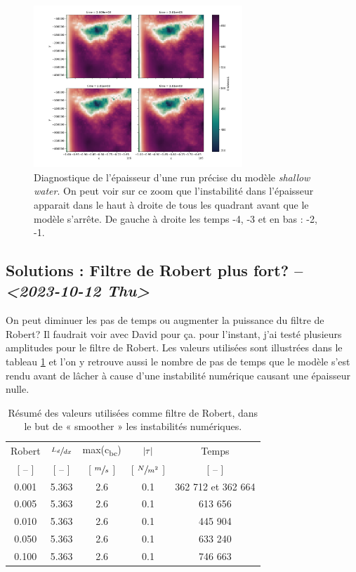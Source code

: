 \documentclass[10pt]{article}
\numberwithin{equation}{section}
\begin{document}
\begin{figure}[!htpb]
\centering
\includegraphics[width=0.7\textwidth]{figures/debuggage/2023_10_08_thickness1_last4steps.png}
\caption{\label{fig:org204dee2}Diagnostique de l'épaisseur d'une run précise du modèle \emph{shallow water}. On peut voir sur ce zoom que l'instabilité dans l'épaisseur apparait dans le haut à droite de tous les quadrant avant que le modèle s'arrête. De gauche à droite les temps -4, -3 et en bas : -2, -1.}
\end{figure}
\subsection{Solutions : Filtre de Robert plus fort? -- \textit{<2023-10-12 Thu>}}
\label{sec:org099173d}
On peut diminuer les pas de temps ou augmenter la puissance du filtre de Robert?
Il faudrait voir avec David pour ça.
pour l'instant, j'ai testé plusieurs amplitudes pour le filtre de Robert.
Les valeurs utilisées sont illustrées dans le tableau \ref{tab:orgb554ef6} et l'on y retrouve aussi le nombre de pas de temps que le modèle s'est rendu avant de lâcher à cause d'une instabilité numérique causant une épaisseur nulle. 

\begin{table}[htbp]
\caption{\label{tab:orgb554ef6}Résumé des valeurs utilisées comme filtre de Robert, dans le but de « smoother » les instabilités numériques.}
\centering
\begin{tabular}{ccccc}
\hline
Robert & \(\sfrac{L_d}{dx}\) & max(c\textsubscript{bc}) & \(\abs{\vb{\tau}}\) & Temps\\
{[} -- ] & {[} -- ] & {[} \(\sfrac{m}{s}\) ] & {[} \(\sfrac{N}{m^2}\) ] & {[} -- ]\\
\hline
\hline
0.001 & 5.363 & 2.6 & 0.1 & 362 712 et 362 664\\
0.005 & 5.363 & 2.6 & 0.1 & 613 656\\
0.010 & 5.363 & 2.6 & 0.1 & 445 904\\
0.050 & 5.363 & 2.6 & 0.1 & 633 240\\
0.100 & 5.363 & 2.6 & 0.1 & 746 663\\
\hline
\hline
\end{tabular}
\end{table}
\end{document}
